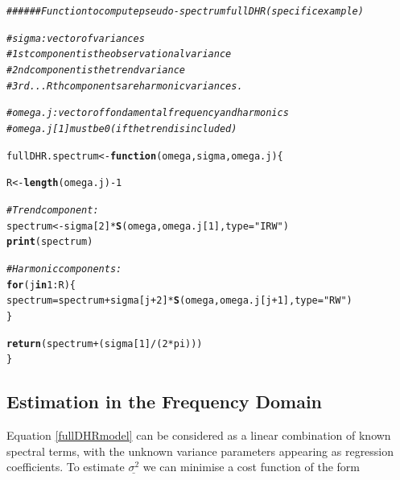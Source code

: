 \documentclass{article}\usepackage[]{graphicx}\usepackage[]{color}
\makeatletter
\newcommand{\hlnum}[1]{\textcolor[rgb]{0.686,0.059,0.569}{#1}}%
\newcommand{\hlstr}[1]{\textcolor[rgb]{0.192,0.494,0.8}{#1}}%
\newcommand{\hlcom}[1]{\textcolor[rgb]{0.678,0.584,0.686}{\textit{#1}}}%
\newcommand{\hlopt}[1]{\textcolor[rgb]{0,0,0}{#1}}%
\newcommand{\hlstd}[1]{\textcolor[rgb]{0.345,0.345,0.345}{#1}}%
\newcommand{\hlkwa}[1]{\textcolor[rgb]{0.161,0.373,0.58}{\textbf{#1}}}%
\newcommand{\hlkwb}[1]{\textcolor[rgb]{0.69,0.353,0.396}{#1}}%
\newcommand{\hlkwc}[1]{\textcolor[rgb]{0.333,0.667,0.333}{#1}}%
\newcommand{\hlkwd}[1]{\textcolor[rgb]{0.737,0.353,0.396}{\textbf{#1}}}%
\newenvironment{kframe}{%
 \def\at@end@of@kframe{}%
 \ifinner\ifhmode%
  \def\at@end@of@kframe{\end{minipage}}%
  \begin{minipage}{\columnwidth}%
 \fi\fi%
 \def\FrameCommand##1{\hskip\@totalleftmargin \hskip-\fboxsep
 \colorbox{shadecolor}{##1}\hskip-\fboxsep
     \hskip-\linewidth \hskip-\@totalleftmargin \hskip\columnwidth}%
 \MakeFramed {\advance\hsize-\width
   \@totalleftmargin\z@ \linewidth\hsize
   \@setminipage}}%
 {\par\unskip\endMakeFramed%
 \at@end@of@kframe}
\newenvironment{knitrout}{}{} %
\makeatother
\begin{document}
\begin{knitrout}\footnotesize
{}\color{fgcolor}\begin{kframe}
\begin{alltt}
\hlcom{###### Function to compute pseudo-spectrum full DHR (specific example)}

\hlcom{# sigma: vector of variances}
\hlcom{#        1st component is the observational variance}
\hlcom{#        2nd component is the trend variance}
\hlcom{#        3rd...Rth components are harmonic variances.}

\hlcom{# omega.j: vector of fondamental frequency and harmonics}
\hlcom{#          omega.j[1] must be 0 (if the trend is included)}

\hlstd{fullDHR.spectrum} \hlkwb{<-} \hlkwa{function}\hlstd{(}\hlkwc{omega}\hlstd{,} \hlkwc{sigma}\hlstd{,} \hlkwc{omega.j}\hlstd{) \{}

  \hlstd{R} \hlkwb{<-} \hlkwd{length}\hlstd{(omega.j)} \hlopt{-} \hlnum{1}

  \hlcom{# Trend component:}
  \hlstd{spectrum} \hlkwb{<-} \hlstd{sigma[}\hlnum{2}\hlstd{]} \hlopt{*} \hlkwd{S}\hlstd{(omega, omega.j[}\hlnum{1}\hlstd{],} \hlkwc{type} \hlstd{=} \hlstr{"IRW"}\hlstd{)}
  \hlkwd{print}\hlstd{(spectrum)}

  \hlcom{# Harmonic components:}
  \hlkwa{for}\hlstd{(j} \hlkwa{in} \hlnum{1}\hlopt{:}\hlstd{R) \{}
    \hlstd{spectrum} \hlkwb{=} \hlstd{spectrum} \hlopt{+} \hlstd{sigma[j} \hlopt{+} \hlnum{2}\hlstd{]} \hlopt{*} \hlkwd{S}\hlstd{(omega, omega.j[j} \hlopt{+} \hlnum{1}\hlstd{],} \hlkwc{type} \hlstd{=} \hlstr{"RW"}\hlstd{)}
  \hlstd{\}}

  \hlkwd{return}\hlstd{(spectrum} \hlopt{+} \hlstd{(sigma[}\hlnum{1}\hlstd{]}\hlopt{/}\hlstd{(}\hlnum{2}\hlopt{*}\hlstd{pi)))}
\hlstd{\}}
\end{alltt}
\end{kframe}
\end{knitrout}


\vspace{0.3cm}

\subsection*{Estimation in the Frequency Domain}

Equation \eqref{fullDHRmodel} can be considered as a linear combination of known spectral terms, with the unknown variance parameters appearing as regression coefficients.
To estimate $\underline{\sigma^2}$ we can minimise a cost function of the form
\end{document}

